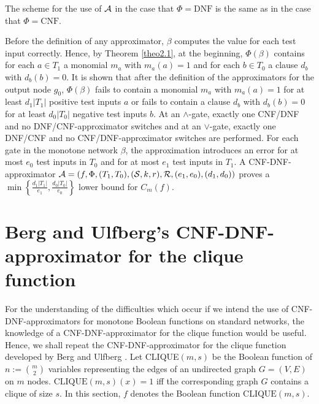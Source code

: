 \documentclass[11pt]{article}
\begin{document}
\smallskip
The scheme for the use of ${\cal A}$ in the case that $\Phi = \mbox{DNF}$ is the same as in the case that
$\Phi = \mbox{CNF}$.

Before the definition of any approximator, $\beta$ computes the value for each test input correctly. Hence, by
Theorem \ref{theo2.1}, at the beginning, $\Phi(\beta)$ contains for each $a \in T_1$ a monomial $m_a$ with
$m_a(a) = 1$ and for each $b \in T_0$ a clause $d_b$ with $d_b(b) = 0$.
It is shown that after the definition of the approximators for the output node $g_0$, $\Phi(\beta)$ fails to
contain a monomial $m_a$ with $m_a(a) = 1$ for at least $d_1|T_1|$ positive test inputs $a$ or fails to contain
a clause $d_b$ with $d_b(b) = 0$ for at least $d_0|T_0|$ negative test inputs $b$.
At an $\wedge$-gate, exactly one CNF/DNF and no DNF/CNF-approximator switches and
at an $\vee$-gate, exactly one DNF/CNF and no CNF/DNF-approxi\-ma\-tor switches are
performed.
For each gate in the
monotone network $\beta$, the approximation introduces an error for at most $e_0$ test inputs in $T_0$ and for
at most $e_1$ test inputs in $T_1$.
A CNF-DNF-approximator ${\cal A} = (f,\Phi,(T_1,T_0),({\cal S},k,r),{\cal R},(e_1,e_0),(d_1,d_0))$ proves a
$\min\left\{\frac{d_1|T_1|}{e_1}, \frac{d_0|T_0|}{e_0}\right\}$ lower bound for $C_m(f)$.


\section{Berg and Ulfberg's CNF-DNF-approximator for the clique function}

For the understanding of the difficulties which occur if we intend the use of CNF-DNF-approximators for
monotone Boolean functions on standard networks, the knowledge of a CNF-DNF-approximator for the clique
function would be useful. Hence, we shall repeat the CNF-DNF-approximator for the clique function developed
by Berg and Ulfberg \cite{BeUl}.
Let CLIQUE$(m,s)$ be the Boolean function of $n := {m \choose 2}$ variables representing the edges of
an undirected graph $G = (V,E)$ on $m$ nodes. $\mbox{CLIQUE}(m,s)(x) = 1$ iff the corresponding graph $G$
contains a clique of size $s$. In this section, $f$ denotes the Boolean function $\mbox{CLIQUE}(m,s)$.
\end{document}
